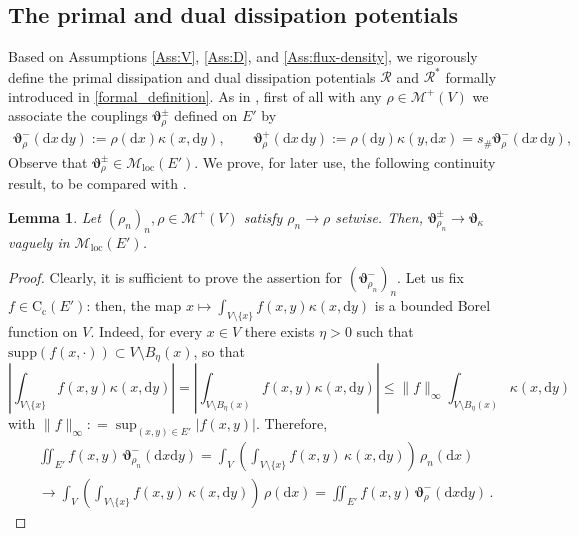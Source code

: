 \documentclass[11pt,reqno]{amsart}
\numberwithin{equation}{section}
\newcommand{\calM}{\mathcal{M}}
\newcommand{\dd}{\mathrm{d}}
\newtheorem{lemma}[theorem]{Lemma}
\theoremstyle{definition}
\def\dd{\mathrm{d}}
\newcommand{\Cc}{\mathrm{C}_{\mathrm{c}}}
\newcommand{\teta}{\boldsymbol \vartheta}
\newcommand{\tetapi}{\boldsymbol{\teta}_{\kappa}}
\newcommand{\scrR}{\mathscr{R}}
\newcommand{\Mloc}{\mathcal{M}_{\mathrm{loc}}}
\numberwithin{equation}{section}
\begin{document}
\subsection{The primal and dual dissipation potentials}
Based on Assumptions \ref{Ass:V},  \ref{Ass:D},  and 
\ref{Ass:flux-density},  we rigorously define the primal 
dissipation
 and dual dissipation
 potentials
$
\scrR$ and $\scrR^*$ formally introduced in \eqref{formal_definition}. 
 As in \cite{PRST22}, first of all with any $\rho \in \calM^+(V)$ we associate the couplings
 $ \teta_{\rho}^\pm$ defined 
  on $E'$ by 
\begin{equation}
\label{rig-def:tetarho}
\begin{aligned}
  \teta_{\rho}^-(\dd x\,\dd y) :=
  \rho(\dd x)\kappa(x,\dd y),\qquad
  \teta_{\rho}^+(\dd x\,\dd y) :=
  \rho(\dd y)\kappa(y,\dd x)=
  s_{\#}\teta_\rho^-(\dd x\,\dd y),
\end{aligned}
\end{equation}
Observe that $\teta_\rho^\pm \in  \Mloc(E')$. We prove, for later use, the following continuity result, to be compared with \cite[Lemma 2.4]{PRST22}.
\begin{lemma}
\label{l:3.4}
Let $(\rho_n)_n,\rho \in \calM^+(V)$ satisfy $\rho_n\to \rho$ setwise. Then, $\teta_{\rho_n}^\pm \to \tetapi$ vaguely in $\Mloc(E')$. 
\end{lemma}
\begin{proof}
Clearly, it is sufficient to prove the assertion for $(\teta_{\rho_n}^-)_n$. 
Let us fix $f\in \Cc(E')$: then, the map $x \mapsto \int_{V{\setminus}\{x\}} f(x,y) \kappa(x,\dd y)$ is a bounded Borel function on $V$. Indeed, for every $x\in V$ there exists $\eta>0$
such that $\mathrm{supp}(f(x,\cdot)) \subset V{\setminus}B_\eta(x)$, so that 
\[
 \left| \int_{V{\setminus}\{x\}} f(x,y) \kappa(x,\dd y) \right| =\left| \int_{V{\setminus}B_\eta(x)} f(x,y) \kappa(x,\dd y) \right| 
\leq \|f\|_\infty \int_{V{\setminus}B_\eta(x)}  \kappa(x,\dd y) 
\]
with $\|f\|_\infty: = \sup_{(x,y)\in E'} |f(x,y)|$. Therefore,
\[
\begin{aligned}
&
\iint_{E'} f(x,y) \, \teta_{\rho_n}^- (\dd x \dd y) = \int_{V} \left(  \int_{V{\setminus}\{x\}} f(x,y) \,\kappa(x,\dd y) \right) \, \rho_n(\dd x) 
\\
&
\longrightarrow  \int_{V} \left(  \int_{V{\setminus}\{x\}} f(x,y) \,\kappa(x,\dd y) \right) \, \rho(\dd x)  = \iint_{E'} f(x,y) \, \teta_{\rho}^- (\dd x \dd y) \,.
\end{aligned}
\]
\end{proof}
\end{document}
